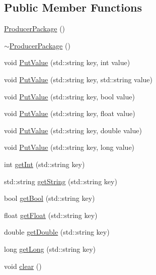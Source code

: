 \subsection*{Public Member Functions}
\begin{DoxyCompactItemize}
\item 
\hyperlink{class_producer_package_ad0ff50fc0caeb025839b0a0d0395a632}{Producer\-Package} ()
\item 
\hyperlink{class_producer_package_a24d5ac3d9f108733295c27154f50da05}{$\sim$\-Producer\-Package} ()
\item 
void \hyperlink{class_producer_package_a193474190e86e201cebd9efd142c92e8}{Put\-Value} (std\-::string key, int value)
\item 
void \hyperlink{class_producer_package_a7214a6c95aef8421391f0a0cad27c65e}{Put\-Value} (std\-::string key, std\-::string value)
\item 
void \hyperlink{class_producer_package_a72faae411e75bc2dbb67aec39d132382}{Put\-Value} (std\-::string key, bool value)
\item 
void \hyperlink{class_producer_package_a3561692b47149c635f3b4a0d86da2dcc}{Put\-Value} (std\-::string key, float value)
\item 
void \hyperlink{class_producer_package_a7ce5fa3c81b1a2f4c0a82e27e7062812}{Put\-Value} (std\-::string key, double value)
\item 
void \hyperlink{class_producer_package_a1ed67ecc939d2c4ea527c51e69fe3b26}{Put\-Value} (std\-::string key, long value)
\item 
int \hyperlink{class_producer_package_aa3bceb26bdc66ce1109461c655d72102}{get\-Int} (std\-::string key)
\item 
std\-::string \hyperlink{class_producer_package_a64b9b886dd7ae4434507af605121f931}{get\-String} (std\-::string key)
\item 
bool \hyperlink{class_producer_package_a45bbe2b88698d9ccf18d9560587dad9f}{get\-Bool} (std\-::string key)
\item 
float \hyperlink{class_producer_package_afc103e26ac8647b5a70baf69fbf3ca96}{get\-Float} (std\-::string key)
\item 
double \hyperlink{class_producer_package_afc8e0a988a08bc2606648753c5756600}{get\-Double} (std\-::string key)
\item 
long \hyperlink{class_producer_package_a9e716245f4d906a7eccd3fd499bc2b9f}{get\-Long} (std\-::string key)
\item 
void \hyperlink{class_producer_package_aba29d881795d34f87986a1ad06de58a3}{clear} ()
\end{DoxyCompactItemize}
